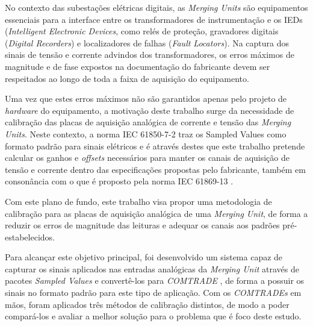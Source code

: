 No contexto das subestações elétricas digitais, as \textit{Merging Units} são equipamentos essenciais para a interface entre os transformadores de instrumentação e os IEDs (\textit{Intelligent Electronic Devices}, como relés de proteção, gravadores digitais (\textit{Digital Recorders}) e localizadores de falhas (\textit{Fault Locators}). Na captura dos sinais de tensão e corrente advindos dos transformadores, os erros máximos de magnitude e de fase expostos na documentação do fabricante devem ser respeitados ao longo de toda a faixa de aquisição do equipamento.


Uma vez que estes erros máximos não são garantidos apenas pelo projeto de \textit{hardware} do equipamento, a motivação deste trabalho surge da necessidade de calibração das placas de aquisição analógica de corrente e tensão das \textit{Merging Units}. Neste contexto, a norma IEC 61850-7-2 \cite{IEC61850_7-2} traz os Sampled Values como formato padrão para sinais elétricos e é através destes que este trabalho pretende calcular os ganhos e \textit{offsets} necessários para manter os canais de aquisição de tensão e corrente dentro das especificações propostas pelo fabricante, também em consonância com o que é proposto pela norma IEC 61869-13 \cite{IEC61869-13}. 

Com este plano de fundo, este trabalho visa propor uma metodologia de calibração para as placas de aquisição analógica de uma \textit{Merging Unit}, de forma a reduzir os erros de magnitude das leituras e adequar os canais aos padrões pré-estabelecidos.

Para alcançar este objetivo principal, foi desenvolvido um sistema capaz de capturar os sinais aplicados nas entradas analógicas da \textit{Merging Unit} através de pacotes \textit{Sampled Values} \cite{IEC61850-9-2} e convertê-los para \textit{COMTRADE} \cite{comtrade1992}, de forma a possuir os sinais no formato padrão para este tipo de aplicação. Com os \textit{COMTRADEs} em mãos, foram aplicados três métodos de calibração distintos, de modo a poder compará-los e avaliar a melhor solução para o problema que é foco deste estudo.
